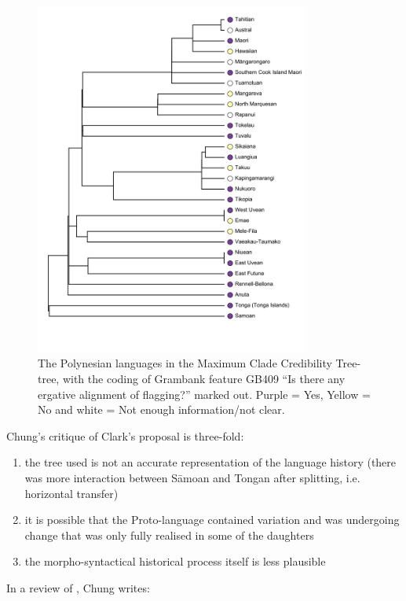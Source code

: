 \documentclass[a4paper,10pt]{article} %
\begin{document}
\begin{figure}[H]
\centering
\includegraphics[width=9cm]{illustrations/plots_from_R//tree_plots/poly_tree_example.png}
\caption{{The Polynesian languages in the \citet{grayetal_2009} Maximum Clade Credibility Tree-tree, with the coding of Grambank feature GB409 ``Is there any ergative alignment of flagging?'' marked out. Purple = Yes, Yellow = No and white = Not enough information/not clear.}}
\label{poly_GB409_tree}
\end{figure} 

Chung's critique of Clark's proposal is three-fold: 
\begin{enumerate}[label=(\alph*)]
\item the tree used is not an accurate representation of the language history (there was more interaction between S\={a}moan and Tongan after splitting, i.e. horizontal transfer)
\item it is possible that the Proto-language contained variation and was undergoing change that was only fully realised in some of the daughters
\item the morpho-syntactical historical process itself is less plausible
\end{enumerate}

In a review of \citet{clark1976aspects}, Chung writes:
\end{document}
